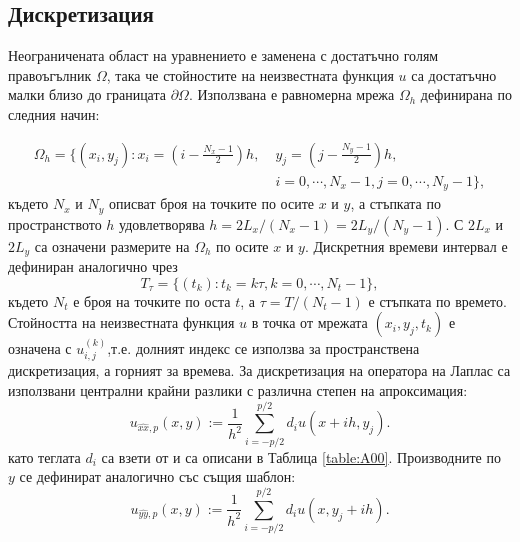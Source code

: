 \documentclass{article}
\theoremstyle{remark}
\begin{document}
\subsection{Дискретизация}\label{discretization}
Неограничената област на уравнението е заменена с достатъчно голям правоъгълник $\Omega$, така че стойностите на неизвестната функция $u$ са достатъчно малки близо до границата $\partial \Omega$. Използвана е равномерна мрежа  $\Omega_h$ дефинирана по следния начин:

\begin{align}\label{Omega}
\Omega_h = \{(x_i,y_j): x_i = (i-\frac{N_x-1}{2})h, \; &y_j = (j-\frac{N_y-1}{2})h, \nonumber\\
                                         & i = 0,\cdots, N_x-1, j = 0 ,\cdots , N_y-1 \},
\end{align}
където $N_x$ и $N_y$ описват броя на точките по осите $x$ и $y$, а стъпката по пространството $h$ удовлетворява $h =2 L_x/(N_x-1) =2 L_y/(N_y-1)$.
С $2 L_x$ и $2 L_y$ са означени размерите на $\Omega_h$ по осите $x$ и $y$. Дискретния времеви интервал е дефиниран аналогично чрез
$$
T_{\tau} = \{(t_k): t_k = k\tau, k = 0,\cdots ,N_t-1 \},
$$
където $N_t$ е броя на точките по оста $t$, а $\tau = T/(N_t-1)$ е стъпката по времето. Стойността на неизвестната функция $u$ в точка от мрежата $(x_i,y_j,t_k)$ е означена с $u_{i,j}^{(k)}$,т.е. долният индекс се използва за пространствена дискретизация, а горният за времева. За дискретизация на оператора на Лаплас са използвани централни крайни разлики с различна степен на апроксимация:
\begin{equation}\label{fdx}
u_{\widehat{xx},p}(x,y) :=  \frac{1}{h^2} \sum\limits_{i=-p/2}^{p/2} d_i u(x+ih, y_j).
\end{equation}
като теглата $d_i$ са взети от \cite{forn} и са описани в Таблица \ref{table:A00}. Производните по $y$ се дефинират аналогично със същия шаблон:
\begin{equation}\label{fdy}
u_{\widehat{yy},p}(x,y) :=  \frac{1}{h^2} \sum\limits_{i=-p/2}^{p/2} d_i u(x, y_j+ih).
\end{equation}
\end{document}
